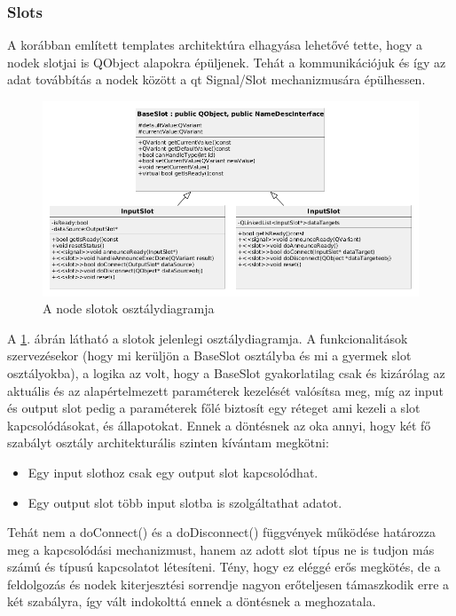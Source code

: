 \documentclass[a4paper,12pt,oneside]{report}
\begin{document}
\subsubsection{Slots}
A korábban említett templates architektúra elhagyása lehetővé tette, hogy a nodek slotjai is QObject alapokra épüljenek. Tehát a kommunikációjuk és így az adat továbbítás a nodek között a qt Signal/Slot mechanizmusára épülhessen.
\begin{center}
\begin{figure}[h]
  \includegraphics[width=1.1\textwidth]{slot_diag.png}
  \caption{A node slotok osztálydiagramja }

  \label{fig:bimg_slot_diag}
\end{figure}
\end{center}
A \ref{fig:bimg_slot_diag}. ábrán látható a slotok jelenlegi osztálydiagramja. A funkcionalitások szervezésekor (hogy mi kerüljön a BaseSlot osztályba és mi a gyermek slot osztályokba), a logika az volt, hogy a BaseSlot gyakorlatilag csak és kizárólag az aktuális és az alapértelmezett paraméterek kezelését valósítsa meg, míg az input és output slot pedig a paraméterek főlé biztosít egy réteget ami kezeli a slot kapcsolódásokat, és állapotokat. Ennek a döntésnek az oka annyi, hogy két fő szabályt osztály architekturális szinten kívántam megkötni:
\begin{itemize}
	\itemsep0em
	\item Egy input slothoz csak egy output slot kapcsolódhat.
	\item Egy output slot több input slotba is szolgáltathat adatot.
\end{itemize}
Tehát nem a doConnect() és a doDisconnect() függvények működése határozza meg a kapcsolódási mechanizmust, hanem az adott slot típus ne is tudjon más számú és típusú kapcsolatot létesíteni. Tény, hogy ez eléggé erős megkötés, de a feldolgozás és nodek kiterjesztési sorrendje nagyon erőteljesen támaszkodik erre a két szabályra, így vált indokolttá ennek a döntésnek a meghozatala.
\end{document}
